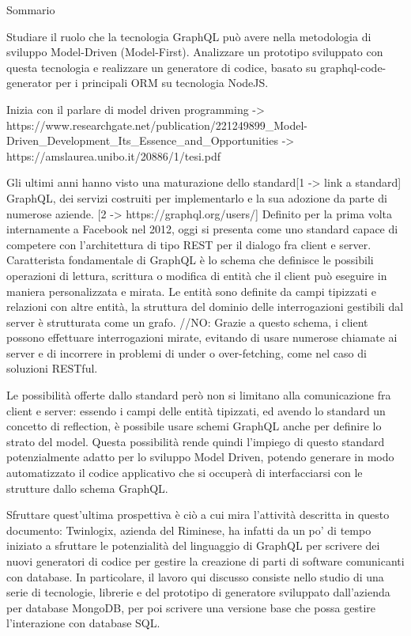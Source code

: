 Sommario

Studiare il ruolo che la tecnologia GraphQL può avere nella metodologia di sviluppo Model-Driven (Model-First).
Analizzare un prototipo sviluppato con questa tecnologia e realizzare un generatore di codice, basato su graphql-code-generator per i principali ORM su tecnologia NodeJS.

Inizia con il parlare di model driven programming -> https://www.researchgate.net/publication/221249899_Model-Driven_Development_Its_Essence_and_Opportunities
-> https://amslaurea.unibo.it/20886/1/tesi.pdf

Gli ultimi anni hanno visto una maturazione dello standard[1 -> link a standard] GraphQL, dei servizi costruiti per implementarlo e la sua adozione da parte di numerose aziende. [2 -> https://graphql.org/users/]
Definito per la prima volta internamente a Facebook nel 2012, oggi si presenta come uno standard capace di competere con l'architettura di tipo REST per il dialogo fra client e server.
Caratterista fondamentale di GraphQL è lo schema che definisce le possibili operazioni di lettura, scrittura o modifica di entità che il client può eseguire in maniera personalizzata e mirata.
Le entità sono definite da campi tipizzati e relazioni con altre entità, la struttura del dominio delle interrogazioni gestibili dal server è strutturata come un grafo.
//NO: Grazie a questo schema, i client possono effettuare interrogazioni mirate, evitando di usare numerose chiamate ai server e di incorrere in problemi di under o over-fetching, come nel caso di soluzioni RESTful.

Le possibilità offerte dallo standard però non si limitano alla comunicazione fra client e server: essendo i campi delle entità tipizzati, ed avendo lo standard un concetto di reflection, è possibile usare 
schemi GraphQL anche per definire lo strato del model.
Questa possibilità rende quindi l'impiego di questo standard potenzialmente adatto per lo sviluppo Model Driven, potendo generare in modo automatizzato il codice applicativo che si occuperà di interfacciarsi con le strutture dallo schema GraphQL.

Sfruttare quest'ultima prospettiva è ciò a cui mira l'attività descritta in questo documento: Twinlogix, azienda del Riminese, ha infatti da un po' di tempo iniziato a sfruttare le potenzialità del linguaggio di GraphQL per scrivere dei nuovi generatori
di codice per gestire la creazione di parti di software comunicanti con database.
In particolare, il lavoro qui discusso consiste nello studio di una serie di tecnologie, librerie e del prototipo di generatore sviluppato dall'azienda per database MongoDB, per poi scrivere una versione base che possa gestire l'interazione con database SQL.



